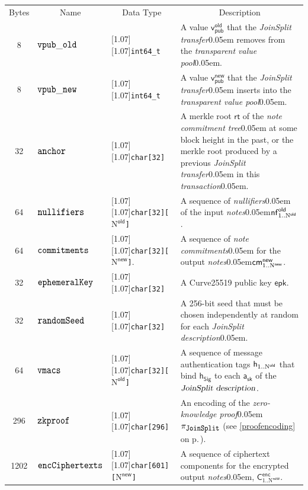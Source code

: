 \documentclass{article}
\renewcommand{\emph}[1]{\hspace{0.15em}{\fontfamily{pnc}\selectfont\scalebox{1.02}[0.999]{\textit{#1}}}\hspace{0.02em}}
\let\oldtexttt\texttt
\let\oldmathtt\mathtt
\renewcommand{\texttt}[1]{\scalebox{1.02}[1.07]{\oldtexttt{#1}}}
\renewcommand{\mathtt}[1]{\scalebox{1.02}[1.07]{$\oldmathtt{#1}$}}
\newcommand{\crossref}[1]{\autoref{#1}\, \emph{`\nameref*{#1}\kern -0.05em'} on p.\,\pageref*{#1}}
\newcommand{\changedcolor}{magenta}
\newcommand{\setchanged}{\color{\changedcolor}}
\newcommand{\term}[1]{\textsl{#1}\kern 0.05em\xspace}
\newcommand{\notes}{\term{notes}}
\newcommand{\noteCommitments}{\term{note commitments}}
\newcommand{\noteCommitmentTree}{\term{note commitment tree}}
\newcommand{\joinSplitDescription}{\term{JoinSplit description}}
\newcommand{\joinSplitTransfer}{\term{JoinSplit transfer}}
\newcommand{\zeroKnowledgeProof}{\term{zero-knowledge proof}}
\newcommand{\transaction}{\term{transaction}}
\newcommand{\transparentValuePool}{\term{transparent value pool}}
\newcommand{\nullifiers}{\term{nullifiers}}
\newcommand{\AuthPrivate}{\mathsf{a_{sk}}}
\newcommand{\enc}{\mathsf{enc}}
\newcommand{\EphemeralPublic}{\mathsf{epk}}
\newcommand{\Ctext}{\mathsf{C}}
\newcommand{\TransmitCiphertext}[1]{\Ctext^\enc_{#1}}
\newcommand{\cmNew}[1]{\mathsf{{cm}^{new}_\mathnormal{#1}}}
\newcommand{\nf}{\mathsf{nf}}
\newcommand{\nfOld}[1]{\nf^\mathsf{old}_\mathnormal{#1}}
\newcommand{\vpubOldField}{\mathtt{vpub\_old}}
\newcommand{\vpubNewField}{\mathtt{vpub\_new}}
\newcommand{\anchorField}{\mathtt{anchor}}
\newcommand{\nullifiersField}{\mathtt{nullifiers}}
\newcommand{\commitments}{\mathtt{commitments}}
\newcommand{\ephemeralKey}{\mathtt{ephemeralKey}}
\newcommand{\encCiphertexts}{\mathtt{encCiphertexts}}
\newcommand{\randomSeed}{\mathtt{randomSeed}}
\newcommand{\heading}[1]{\multicolumn{1}{c|}{#1}}
\newcommand{\type}[1]{\texttt{#1}}
\newcommand{\JoinSplit}{\text{\footnotesize\texttt{JoinSplit}}}
\newcommand{\Proof}{\pi}
\newcommand{\JoinSplitProof}{\Proof_{\JoinSplit}}
\newcommand{\zkproof}{\mathtt{zkproof}}
\newcommand{\hSig}{\mathsf{h_{Sig}}}
\newcommand{\h}[1]{\mathsf{h_{\mathnormal{#1}}}}
\newcommand{\NOld}{\mathrm{N}^\mathsf{old}}
\newcommand{\NNew}{\mathrm{N}^\mathsf{new}}
\newcommand{\allN}[1]{\mathrm{1}..\mathrm{N}^\mathsf{#1}}
\newcommand{\allOld}{\allN{old}}
\newcommand{\allNew}{\allN{new}}
\newcommand{\vmacs}{\mathtt{vmacs}}
\newcommand{\vpubOld}{\mathsf{v_{pub}^{old}}}
\newcommand{\vpubNew}{\mathsf{v_{pub}^{new}}}
\newcommand{\rt}{\mathsf{rt}}
\begin{document}
\begin{center}
\begin{tabularx}{0.92\textwidth}{|c|l|l|X|}
\hline
Bytes & \heading{Name} & \heading{Data Type} & \heading{Description} \\
\hhline{|=|=|=|=|}

\setchanged 8 &\setchanged $\vpubOldField$ &\setchanged \type{int64\_t} &\mbox{}\setchanged
A value $\vpubOld$ that the \joinSplitTransfer removes from the \transparentValuePool. \\ \hline

8 & $\vpubNewField$ & \type{int64\_t} & A value $\vpubNew$ that the \joinSplitTransfer inserts
into the \transparentValuePool. \\ \hline

32 & $\anchorField$ & \type{char[32]} & A merkle root $\rt$ of the \noteCommitmentTree at
some block height in the past, or the merkle root produced by a previous \joinSplitTransfer in
this \transaction. \\ \hline

64 & $\nullifiersField$ & \type{char[32][$\NOld$]} & A sequence of \nullifiers of the input
\notes $\nfOld{\allOld}$. \\ \hline

64 & $\commitments$ & \type{char[32][$\NNew$]}. & A sequence of \noteCommitments for the
output \notes $\cmNew{\allNew}$. \\ \hline

\setchanged 32 &\setchanged $\ephemeralKey$ &\setchanged \type{char[32]} &\mbox{}\setchanged
A Curve25519 public key $\EphemeralPublic$. \\ \hline

\setchanged 32 &\setchanged $\randomSeed$ &\setchanged \type{char[32]} &\mbox{}\setchanged
A 256-bit seed that must be chosen independently at random for each \joinSplitDescription. \\ \hline

64 & $\vmacs$ & \type{char[32][$\NOld$]} & A sequence of message authentication tags
$\h{\allOld}$ that bind $\hSig$ to each $\AuthPrivate$ of the
$\joinSplitDescription$. \\ \hline

296 & $\zkproof$ & \type{char[296]} & An encoding of the \zeroKnowledgeProof $\JoinSplitProof$
(see \crossref{proofencoding}). \\ \hline

1202 & $\encCiphertexts$ & \type{char[601][$\NNew$]} & A sequence of ciphertext
components for the encrypted output \notes, $\TransmitCiphertext{\allNew}$. \\ \hline

\end{tabularx}
\end{center}
\end{document}
